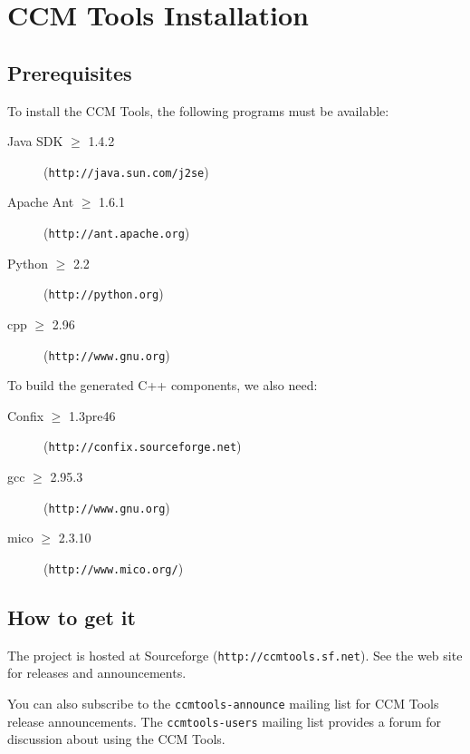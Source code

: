 \chapter{CCM Tools Installation}


\section{Prerequisites}

To install the CCM Tools, the following programs must be available:
\begin{description}
\item [Java SDK $\ge$ 1.4.2] ({\tt http://java.sun.com/j2se})
\item [Apache Ant $\ge$ 1.6.1] ({\tt http://ant.apache.org})
\item [Python $\ge$ 2.2] ({\tt http://python.org})
\item [cpp $\ge$ 2.96] ({\tt http://www.gnu.org})
\end{description}

To build the generated C++ components, we also need:
\begin{description}
\item [Confix $\ge$ 1.3pre46] ({\tt http://confix.sourceforge.net})
\item [gcc $\ge$ 2.95.3] ({\tt http://www.gnu.org})
\item [mico $\ge$ 2.3.10] ({\tt http://www.mico.org/})
\end{description}


\section{How to get it}

The project is hosted at Sourceforge ({\tt http://ccmtools.sf.net}). See the web
site for releases and announcements.

You can also subscribe to the {\tt ccmtools-announce} mailing list for CCM Tools
release announcements. The {\tt ccmtools-users} mailing list provides a forum
for discussion about using the CCM Tools.


